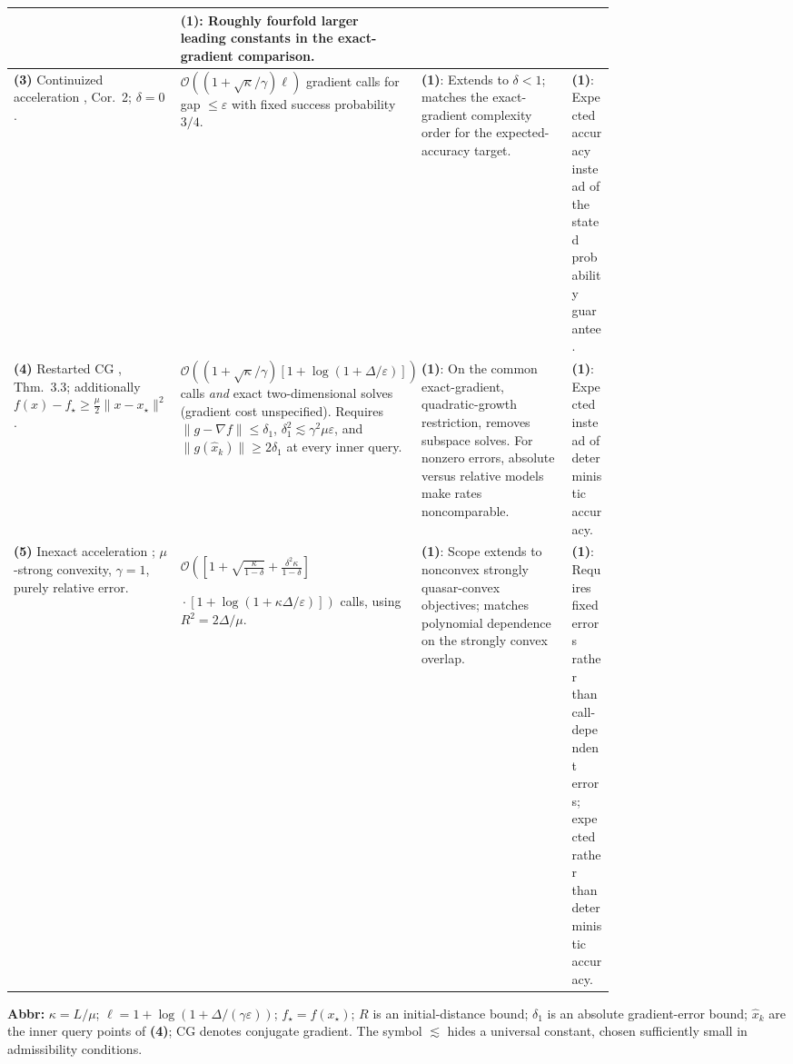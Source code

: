\begin{table}[tp]
\begin{threeparttable}
\begin{tabularx}{\linewidth}{@{}>{\raggedright\arraybackslash}p{0.20\linewidth}>{\raggedright\arraybackslash}p{0.32\linewidth}>{\raggedright\arraybackslash}p{0.25\linewidth}>{\raggedright\arraybackslash}X@{}}
& \textbf{(1)}: Roughly fourfold larger leading constants in the exact-gradient comparison. \\
\midrule
\textbf{(3)} Continuized acceleration \citep{rqWangWibisono2023}, Cor.~2; $\delta=0$.
& $\mathcal{O}\!\left((1+\sqrt{\kappa}/\gamma)\ell\right)$ gradient calls for gap $\le\varepsilon$ with fixed success probability $3/4$.
& \textbf{(1)}: Extends to $\delta<1$; matches the exact-gradient complexity order for the expected-accuracy target.
& \textbf{(1)}: Expected accuracy instead of the stated probability guarantee. \\
\midrule
\textbf{(4)} Restarted CG \citep{rqKuruzovStonyakin2026v3}, Thm.~3.3; additionally $f(x)-f_\star\ge\frac\mu2\|x-x_\star\|^2$.
& $\mathcal{O}\!\left((1+\sqrt\kappa/\gamma)[1+\log(1+\Delta/\varepsilon)]\right)$ calls \emph{and} exact two-dimensional solves (gradient cost unspecified). Requires $\|g-\nabla f\|\le\delta_1$, $\delta_1^2\lesssim\gamma^2\mu\varepsilon$, and $\|g(\hat x_k)\|\ge2\delta_1$ at every inner query.
& \textbf{(1)}: On the common exact-gradient, quadratic-growth restriction, removes subspace solves. For nonzero errors, absolute versus relative models make rates noncomparable.
& \textbf{(1)}: Expected instead of deterministic accuracy. \\
\midrule
\textbf{(5)} Inexact acceleration \citep{rqInexactRepository}; $\mu$-strong convexity, $\gamma=1$, purely relative error.
& $\mathcal{O}\!\left(\left[1+\sqrt{\frac\kappa{1-\delta}}+\frac{\delta^2\kappa}{1-\delta}\right]\right.$\par
$\left.{}\cdot[1+\log(1+\kappa\Delta/\varepsilon)]\right)$ calls, using $R^2=2\Delta/\mu$.
& \textbf{(1)}: Scope extends to nonconvex strongly quasar-convex objectives; matches polynomial dependence on the strongly convex overlap.
& \textbf{(1)}: Requires fixed errors rather than call-dependent errors; expected rather than deterministic accuracy. \\
\bottomrule
\end{tabularx}
\begin{tablenotes}[flushleft]\footnotesize
\item[] \textbf{Abbr:} $\kappa=L/\mu$; $\ell=1+\log(1+\Delta/(\gamma\varepsilon))$; $f_\star=f(x_\star)$; $R$ is an initial-distance bound; $\delta_1$ is an absolute gradient-error bound; $\hat x_k$ are the inner query points of \textbf{(4)}; CG denotes conjugate gradient. The symbol $\lesssim$ hides a universal constant, chosen sufficiently small in admissibility conditions.
\end{tablenotes}
\end{threeparttable}
\end{table}
\clearpage
